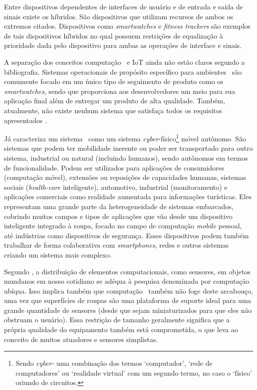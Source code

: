 		Entre dispositivos dependentes de interfaces de usuário e de entrada e saída de sinais existe os híbridos. São dispositivos que utilizam recursos de ambos os extremos citados.
      Dispositivos como \textit{smartwatches} e \textit{fitness trackers} são exemplos de tais dispositivos híbridos no qual possuem restrições de equalização à prioridade dada pelo dispositivo para ambas as operações de interface e sinais.

		A separação dos conceitos computação \wearable\ e IoT ainda não estão claros segundo a bibliografia.
      Sistemas operacionais de propósito específico para ambientes \wearable\ são comumente focado em um único tipo de seguimento de produto como os \textit{smartwatches}, sendo que proporciona aos desenvolvedores um meio para sua aplicação final além de entregar um produto de alta qualidade.
      Também, atualmente, não existe nenhum sistema que satisfaça todos os requisitos apresentados \citep{Amorim2017}.

		Já \citet{Jozwiak2017} caracteriza um sistema \wearable\ como um sistema \textit{cyber}-físico\footnote{Sendo \textit{cyber-} uma combinação dos termos `computador', `rede de computadores' ou `realidade virtual' com um segundo termo, no caso o `físico' oriundo de circuitos.} móvel autônomo.
      São sistemas que podem ter mobilidade inerente ou poder ser transportado para outro sistema, industrial ou natural (incluindo humanos), sendo autônomos em termos de funcionalidade.
      Podem ser utilizados para aplicações de consumidores (computação móvel), extensões ou reposições de capacidades humanas, sistemas sociais (\textit{health-care} inteligente), automotivo, industrial (monitoramento) e aplicações comerciais como realidade aumentada para informações turísticas.
		Eles representam uma grande parte da heterogeneidade de sistemas embarcados, cobrindo muitos campos e tipos de aplicações que vão desde um dispositivo inteligente integrado à roupa, focado no campo de computação \textit{mobile} pessoal, até indústrias como dispositivos de segurança. %
      Esses dispositivos podem também trabalhar de forma colaborativa com \textit{smartphones}, redes e outros sistemas criando um sistema mais complexo.

		Segundo \citet{VanLaerhoven2002}, a distribuição de elementos computacionais, como sensores, em objetos mundanos em nosso cotidiano se adéqua à pesquisa denominada por computação ubíqua.
      Isso implica também que computação \wearable\ também não foge deste arcabouço, uma vez que superfícies de roupas são uma plataforma de suporte ideal para uma grande quantidade de sensores (desde que sejam miniaturizados para que eles não obstruam o usuário).
		Essa restrição de tamanho geralmente significa que a própria qualidade do equipamento também está comprometida, o que leva ao conceito de muitos atuadores e sensores simplistas.

